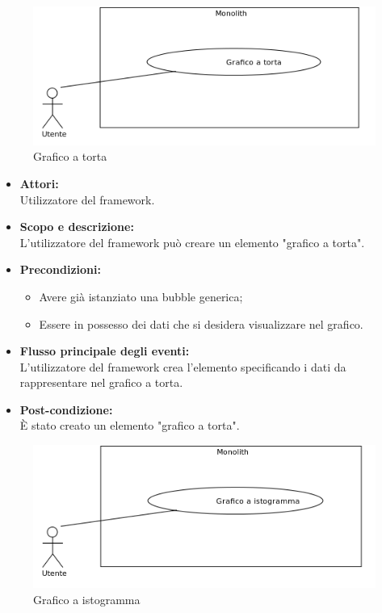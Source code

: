 \pagebreak


\begin{figure}[H]
	\centering
	\includegraphics[width=15cm]{../../documenti/AnalisiDeiRequisiti/Diagrammi_img/uc1_28.png}
	\caption{\UCFFCaption{} Grafico a torta}
\end{figure}

\begin{itemize}
	\item \textbf{Attori:}
	\\Utilizzatore del framework.
	\item \textbf{Scopo e descrizione:} 
	\\L'utilizzatore del framework può creare un elemento "grafico a torta".
	\item \textbf{Precondizioni:}
	\begin{itemize}
		\item Avere già istanziato una bubble generica;
		\item Essere in possesso dei dati che si desidera visualizzare nel grafico.
	\end{itemize}
	\item \textbf{Flusso principale degli eventi:}
	\\L'utilizzatore del framework crea l'elemento specificando i dati da rappresentare nel grafico a torta.
	\item \textbf{Post-condizione:}
	\\È stato creato un elemento "grafico a torta".
\end{itemize}

\pagebreak


\begin{figure}[H]
	\centering
	\includegraphics[width=15cm]{../../documenti/AnalisiDeiRequisiti/Diagrammi_img/uc1_29.png}
	\caption{\UCFFCaption{} Grafico a istogramma}
\end{figure}

